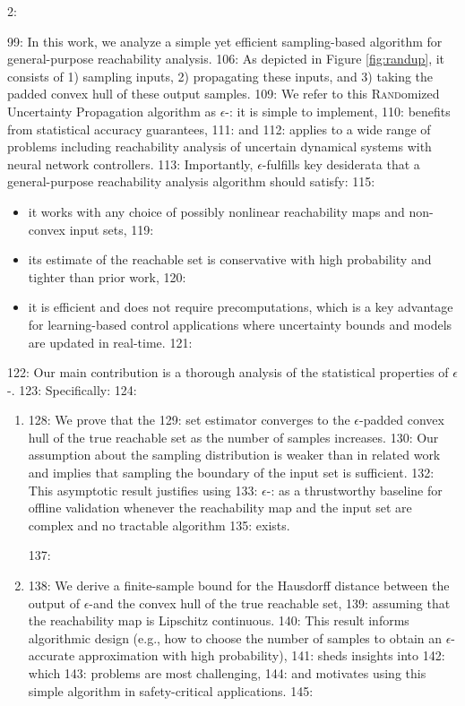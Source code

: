 2: \documentclass[12pt]{l4dc2022} %
\begin{document}
99: In this work, we analyze a simple yet efficient sampling-based algorithm for general-purpose reachability analysis. 
106: As depicted in Figure \ref{fig:randup}, it consists of 1) sampling inputs, 2) propagating these inputs, and 3) taking the padded convex hull of these output samples.   
109: We refer to this \textsc{Rand}omized \textsc{U}ncertainty \textsc{P}ropagation algorithm as $\epsilon$-\randup: it is simple to implement, 
110: benefits from statistical accuracy guarantees, 
111: and
112: applies to a wide range of problems including reachability analysis of uncertain dynamical systems with neural network controllers. 
113: Importantly, $\epsilon$-\randup fulfills key desiderata that a general-purpose reachability analysis algorithm should satisfy:
115: \begin{itemize}[leftmargin=5mm]
116: \setlength\itemsep{0mm}
117: \vspace{-1mm}
118: \item it works with any choice of possibly nonlinear reachability maps and non-convex input sets,
119: \item its estimate of the reachable set is conservative with high probability and tighter than prior work,
120: \item it is efficient and does not require precomputations, which is a key advantage for learning-based control applications where uncertainty bounds and models are updated in real-time. 
121: \end{itemize}
122: Our main contribution is a thorough analysis of the statistical properties of $\epsilon$-\randup. 
123: Specifically:
124: \begin{enumerate}[leftmargin=5mm]
125: \setlength\itemsep{0mm}
126: \vspace{-1mm}
127: \item %
128: We prove that the %
129: set estimator converges to the $\epsilon$-padded convex hull of the true reachable set as the number of samples increases. %
130: Our assumption about the sampling distribution is weaker than in related work and implies that sampling the boundary of the input set is sufficient. %
132: This asymptotic result justifies using %
133: $\epsilon$-: as a thrustworthy baseline for offline validation whenever the reachability map and the input set are complex and no tractable algorithm %
135: exists. 

137: \item %
138: We derive a finite-sample bound for the Hausdorff distance between the output of $\epsilon$-\randup and the convex hull of the true reachable set, %
139: assuming that the reachability map is Lipschitz continuous. 
140: This result informs algorithmic design (e.g., how to choose the number of samples to obtain an $\epsilon$-accurate approximation with high probability), 
141: sheds insights into %
142: which %
143: problems are most challenging, 
144: and motivates using this simple algorithm in safety-critical applications. 
145: \end{enumerate}
\end{document}
